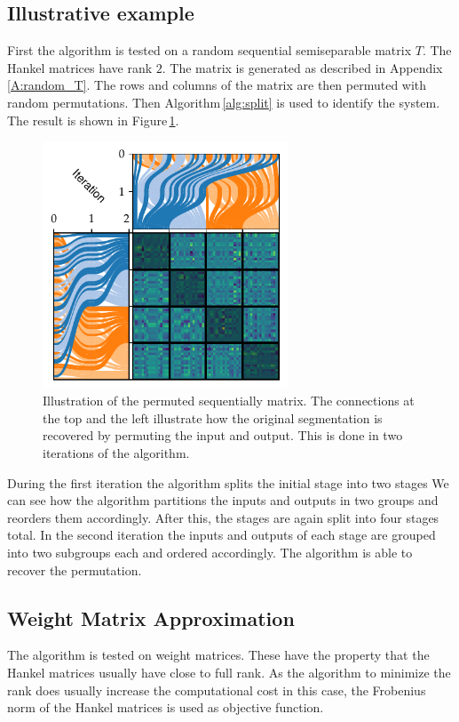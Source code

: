 \documentclass[numbers=noenddot,doctype=mastersthesis,BCOR=15mm,biblatex]{ldvbook}%
\begin{document}
\subsection{Illustrative example}
First the algorithm is tested on a random sequential semiseparable matrix $T$.
The Hankel matrices have rank $2$.
The matrix is generated as described in Appendix\,\ref{A:random_T}. 
The rows and columns of the matrix are then permuted with random permutations.
Then Algorithm\,\ref{alg:split} is used to identify the system.
The result is shown in Figure\,\ref{fig:example_permute}.
\begin{figure}[!htb]
	\centering
	\includegraphics[width=0.65\textwidth]{Plots/example_permute.pdf}
	\caption{Illustration of the permuted sequentially matrix.
		The connections at the top and the left illustrate how the original segmentation is recovered by permuting the input and output.
		This is done in two iterations of the algorithm.
	}
	\label{fig:example_permute}
\end{figure}
During the first iteration the algorithm splits the initial stage into two stages
We can see how the algorithm partitions the inputs and outputs in two groups and reorders them accordingly.
After this, the stages are again split into four stages total.
In the second iteration the inputs and outputs of each stage are grouped into two subgroups each and ordered accordingly.
The algorithm is able to recover the permutation.

\subsection{Weight Matrix Approximation}
The algorithm is tested on weight matrices.
These have the property that the Hankel matrices usually have close to full rank. 
As the algorithm to minimize the rank does usually increase the computational cost in this case, the Frobenius norm of the Hankel matrices is used as objective function.
\end{document}
